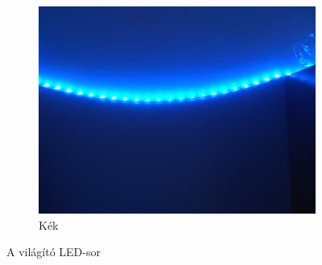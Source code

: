 \documentclass[12pt]{extarticle}
\begin{document}
\begin{figure}[h!]
\begin{subfigure}[b]{0.3\linewidth}
			\includegraphics[width=\linewidth]{kek.jpg}
			\caption{Kék}
		\end{subfigure}
		\caption{A világító LED-sor}
		\label{}
	\end{figure}
\end{document}
